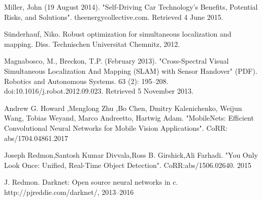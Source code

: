 \documentclass[a4paper, 10pt, conference]{ieeeconf}      %
\begin{document}
\begin{thebibliography}{99}

Miller, John (19 August 2014). "Self-Driving Car Technology's Benefits, Potential Risks, and Solutions". theenergycollective.com. Retrieved 4 June 2015.

 Sünderhauf, Niko. Robust optimization for simultaneous localization and mapping. Diss. Technischen Universitat Chemnitz, 2012.

 Magnabosco, M., Breckon, T.P. (February 2013). "Cross-Spectral Visual Simultaneous Localization And Mapping (SLAM) with Sensor Handover" (PDF). Robotics and Autonomous Systems. 63 (2): 195–208. doi:10.1016/j.robot.2012.09.023. Retrieved 5 November 2013.

 Andrew G. Howard ,Menglong Zhu ,Bo Chen, Dmitry Kalenichenko, Weijun Wang, Tobias Weyand, Marco Andreetto, Hartwig Adam. "MobileNets: Efficient Convolutional Neural Networks for Mobile Vision Applications". CoRR: abs/1704.04861.2017

Joseph Redmon,Santosh Kumar Divvala,Ross B. Girshick,Ali Farhadi. "You Only Look Once: Unified, Real-Time Object Detection". CoRR:abs/1506.02640. 2015

J. Redmon. Darknet: Open source neural networks in c. http://pjreddie.com/darknet/, 2013–2016





\end{thebibliography}
\end{document}
